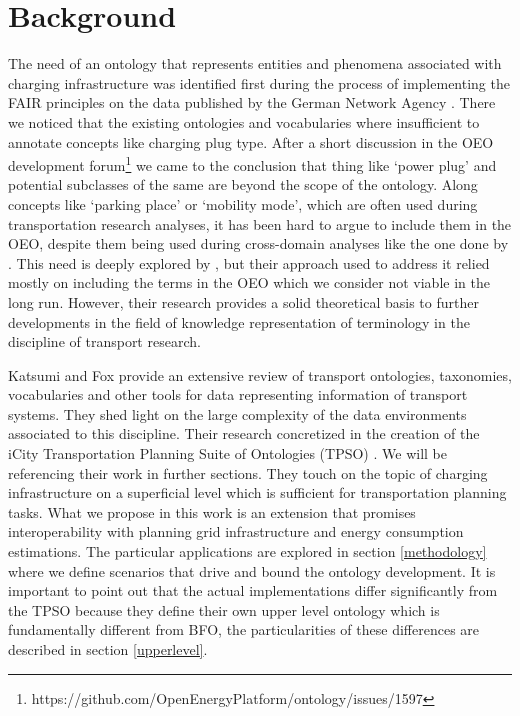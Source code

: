 ﻿\section{Background}
\label{statementofneed}
The need of an ontology that represents entities and phenomena associated with
charging infrastructure was identified first during the process of implementing
the FAIR principles on the data published by the German Network Agency
\cite{ArellanoRuiz.2024}. There we noticed that the existing ontologies and
vocabularies where insufficient to annotate concepts like charging plug type.
After a short discussion in the OEO development
forum\footnote{https://github.com/OpenEnergyPlatform/ontology/issues/1597} we
came to the conclusion that thing like `power plug' and potential subclasses of
the same are beyond the scope of the ontology. Along concepts like `parking
place' or `mobility mode', which are often used during transportation research
analyses, it has been hard to argue to include them in the OEO, despite them
being used during cross-domain analyses like the one done by \cite{Hecht.2022}.
This need is deeply explored by \cite{Mittermeier.2023}, but their approach
used to address it relied mostly on including the terms in the OEO which we
consider not viable in the long run. However, their research provides a solid
theoretical basis to further developments in the field of knowledge
representation of terminology in the discipline of transport research.

Katsumi and Fox \cite{Katsumi.2018} provide an extensive review of transport
ontologies, taxonomies, vocabularies and other tools for data representing
information of transport systems. They shed light on the large complexity of
the data environments associated to this discipline. Their research concretized
in the creation of the iCity Transportation Planning Suite of Ontologies (TPSO)
\cite{Katsumi.2019}. We will be referencing their work in further sections.
They touch on the topic of charging infrastructure on a superficial level which
is sufficient for transportation planning tasks. What we propose in this work
is an extension that promises interoperability with planning grid
infrastructure and energy consumption estimations. The particular applications
are explored in section \ref{methodology} where we define scenarios that drive
and bound the ontology development. It is important to point out that the
actual implementations differ significantly from the TPSO because they define
their own upper level ontology which is fundamentally different from BFO, the
particularities of these differences are described in section \ref{upperlevel}.